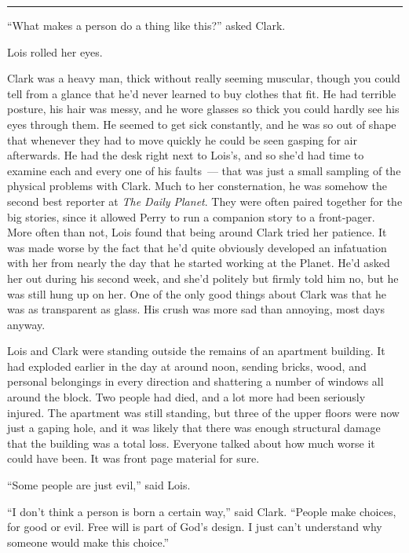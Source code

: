 \documentclass[ebook,12pt]{memoir}
\begin{document}
\begin{center}\rule{0.5\linewidth}{0.5pt}\end{center}

``What makes a person do a thing like this?'' asked Clark.

Lois rolled her eyes.

Clark was a heavy man, thick without really seeming muscular, though you
could tell from a glance that he'd never learned to buy clothes that
fit. He had terrible posture, his hair was messy, and he wore glasses so
thick you could hardly see his eyes through them. He seemed to get sick
constantly, and he was so out of shape that whenever they had to move
quickly he could be seen gasping for air afterwards. He had the desk
right next to Lois's, and so she'd had time to examine each and every
one of his faults~--- that was just a small sampling of the physical
problems with Clark. Much to her consternation, he was somehow the
second best reporter at \emph{The Daily Planet}. They were often paired
together for the big stories, since it allowed Perry to run a companion
story to a front‐pager. More often than not, Lois found that being
around Clark tried her patience. It was made worse by the fact that he'd
quite obviously developed an infatuation with her from nearly the day
that he started working at the Planet. He'd asked her out during his
second week, and she'd politely but firmly told him no, but he was still
hung up on her. One of the only good things about Clark was that he was
as transparent as glass. His crush was more sad than annoying, most days
anyway.

Lois and Clark were standing outside the remains of an apartment
building. It had exploded earlier in the day at around noon, sending
bricks, wood, and personal belongings in every direction and shattering
a number of windows all around the block. Two people had died, and a lot
more had been seriously injured. The apartment was still standing, but
three of the upper floors were now just a gaping hole, and it was likely
that there was enough structural damage that the building was a total
loss. Everyone talked about how much worse it could have been. It was
front page material for sure.

``Some people are just evil,'' said Lois.

``I don't think a person is born a certain way,'' said Clark. ``People
make choices, for good or evil. Free will is part of God's design. I
just can't understand why someone would make this choice.''
\end{document}
